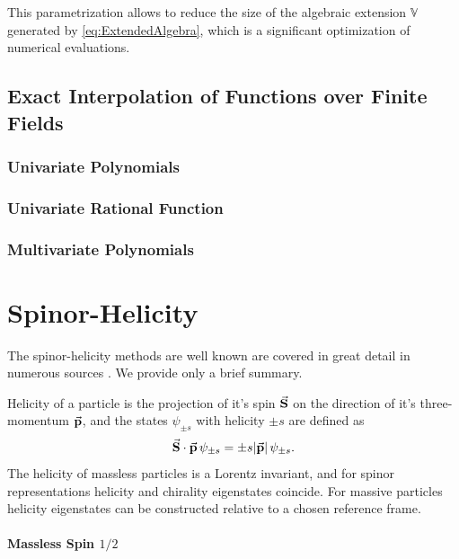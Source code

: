 This parametrization allows to reduce the size of the algebraic extension $\mathbb{V}$ generated by \cref{eq:ExtendedAlgebra},
which is a significant optimization of numerical evaluations.




\section{Exact Interpolation of Functions over Finite Fields}
\label{sec:func_reconstruction}

\subsection{Univariate Polynomials}

\subsection{Univariate Rational Function}

\subsection{Multivariate Polynomials}



\chapter{Spinor-Helicity}
\label{chap:4dspinhel}

The spinor-helicity methods are well known are covered 
in great detail in numerous sources .
We provide only a brief summary.

Helicity of a particle is the projection of it's spin $\va{S}$ on the direction of it's
three-momentum $\va{p}$, and the states $\psi_{\pm s}$ with helicity $\pm s$ are defined as
\begin{equation} \label{eq:helicity_def}
  \sp(\va{S},\va{p}) \, \psi_{\pm s} = \pm s \abs{\va{p}}\, \psi_{\pm s}.
\end{equation}
The helicity of massless particles is a Lorentz invariant, and for spinor representations helicity and chirality eigenstates
coincide. 
For massive particles helicity eigenstates can be constructed relative to a chosen reference frame.


\subsubsection{Massless Spin $1/2$}

